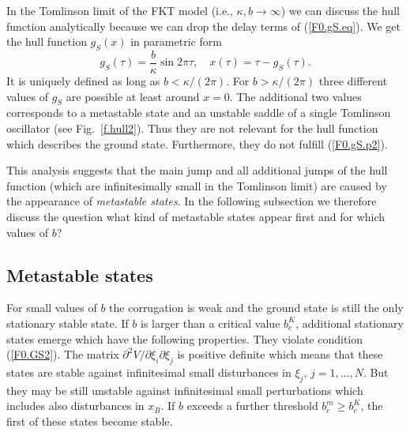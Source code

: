 In the Tomlinson limit of the FKT model (i.e., $\kappa,b\to\infty$)
we can discuss the hull function analytically
because we can drop the delay terms of (\ref{F0.gS.eq}). We get
the hull function $g_S(x)$ in parametric form
\begin{equation}
g_S(\tau)=\frac{b}{\kappa}\sin 2\pi\tau,\quad x(\tau)=\tau-g_S(\tau).
  \label{F0.g}
\end{equation}
It is uniquely defined as long as $b<\kappa/(2\pi)$. For
$b>\kappa/(2\pi)$ three different values of $g_S$ are possible at
least around $x=0$. The additional two values corresponds to a
metastable state and an unstable saddle of a single Tomlinson
oscillator (see Fig.~\ref{f.hull2}). Thus they are not relevant for
the hull function which describes the ground state. Furthermore, they
do not fulfill (\ref{F0.gS.p2}).

This analysis suggests that the main jump and all additional jumps of
the hull function (which are infinitesimally small in the Tomlinson
limit) are caused by the appearance of {\em metastable states\/}. In
the following subsection we therefore discuss the question what kind
of metastable states appear first and for which values of $b$?

\subsection{\protect\label{F02}Metastable states}

For small values of $b$ the corrugation is weak and the ground state
is still the only stationary stable state. If $b$ is larger than a 
critical value $b_c^K$, additional stationary states emerge which
have the following properties. They violate condition (\ref{F0.GS2}).
The matrix $\partial^2V/\partial\xi_i\partial\xi_j$ is positive
definite which means that these states are stable against
infinitesimal small disturbances in $\xi_j$, $j=1,\ldots,N$. But they
may be still unstable against infinitesimal small perturbations
which includes also disturbances in $x_B$. If $b$ exceeds a further
threshold $b_c^m\ge b_c^K$, the first of these states become stable. 

